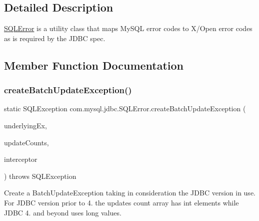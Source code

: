 \subsection{Detailed Description}
\mbox{\hyperlink{classcom_1_1mysql_1_1jdbc_1_1_s_q_l_error}{S\+Q\+L\+Error}} is a utility class that maps My\+S\+QL error codes to X/\+Open error codes as is required by the J\+D\+BC spec. 

\subsection{Member Function Documentation}
\mbox{\label{classcom_1_1mysql_1_1jdbc_1_1_s_q_l_error_a679aee33cf253b786dfc70bbd1631e88}} 
\subsubsection{\texorpdfstring{create\+Batch\+Update\+Exception()}{createBatchUpdateException()}}
{\footnotesize\ttfamily static S\+Q\+L\+Exception com.\+mysql.\+jdbc.\+S\+Q\+L\+Error.\+create\+Batch\+Update\+Exception (\begin{DoxyParamCaption}\item[{S\+Q\+L\+Exception}]{underlying\+Ex,  }\item[{long \mbox{[}$\,$\mbox{]}}]{update\+Counts,  }\item[{\mbox{\hyperlink{interfacecom_1_1mysql_1_1jdbc_1_1_exception_interceptor}{Exception\+Interceptor}}}]{interceptor }\end{DoxyParamCaption}) throws S\+Q\+L\+Exception\hspace{0.3cm}{\ttfamily [static]}}

Create a Batch\+Update\+Exception taking in consideration the J\+D\+BC version in use. For J\+D\+BC version prior to 4. the updates count array has int elements while J\+D\+BC 4. and beyond uses long values.


